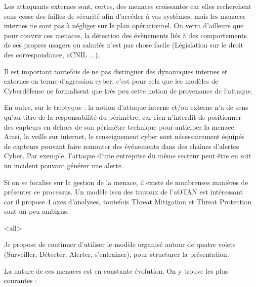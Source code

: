 Les attaquants externes sont, certes, des menaces croissantes car elles recherchent sans cesse des failles de sécurité afin d’accéder à vos systèmes, mais les menaces internes ne sont  pas à négliger sur le plan opérationnel. On verra d'ailleurs que pour couvrir ces menaces, la détection des évènements liés à des comportements de ses propres usagers ou salariés n'est pas chose facile (Législation sur le droit des correspondance, \gls{aCNIL} ...).

Il est important toutefois de ne pas distinguer des dynamiques internes et externes en terme d'agression cyber, c'est pour cela que les modèles de Cyberdéfense ne formalisent que très peu cette notion de provenance de l'attaque.

En outre, sur le triptyque  . la notion d'attaque interne et/ou externe n'a de sens qu'au titre de la responsabilité du périmètre, car rien n'interdit de positionner des capteurs en dehors de son périmètre technique pour anticiper la menace. Ainsi, la veille sur internet, le renseignement cyber sont nécessairement équipés de capteurs pouvant faire remonter des événements dans des chaînes d'alertes Cyber.
Par exemple, l'attaque d'une entreprise du même secteur peut être  en soit un incident pouvant générer une alerte.

Si on se focalise sur la gestion de la menace, il existe de nombreuses manières de présenter ce processus. Un modèle  issu des travaux de l'\gls{aOTAN} est intéressant car il propose 4 axes d'analyses, toutefois Threat Mitigation et Threat Protection sont un peu ambigus.


\mode<all>{}

Je propose de continuer d'utiliser le modèle organisé autour de quatre volets (Surveiller, Détecter, Alerter, s'entrainer),  pour structurer la présentation.


La nature de ces menaces est en constante évolution.  On y trouve les plus courantes :

